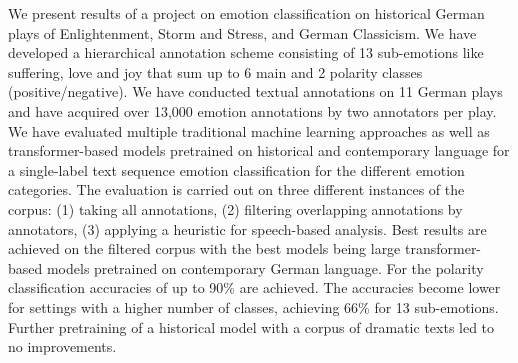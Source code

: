 We present results of a project on  emotion classification on historical German plays of Enlightenment, Storm and Stress, and German Classicism. We have developed a hierarchical annotation scheme consisting of 13 sub-emotions like suffering, love and joy that sum up to 6 main and 2 polarity classes (positive/negative). We have conducted textual annotations on 11 German plays and have acquired over 13,000 emotion annotations by two annotators per play. We have evaluated multiple traditional machine learning approaches as well as transformer-based models pretrained on historical and contemporary language for a single-label text sequence emotion classification for the different emotion categories. The evaluation is carried out on three different instances of the corpus: (1) taking all annotations, (2) filtering overlapping annotations by annotators, (3) applying a heuristic for speech-based analysis. Best results are achieved on the filtered corpus with the best models being large transformer-based models pretrained on contemporary German language. For the polarity classification accuracies of up to 90\% are achieved. The accuracies become lower for settings with a higher number of classes,  achieving 66\% for 13 sub-emotions. Further pretraining of a historical model with a corpus of dramatic texts led to no improvements.
